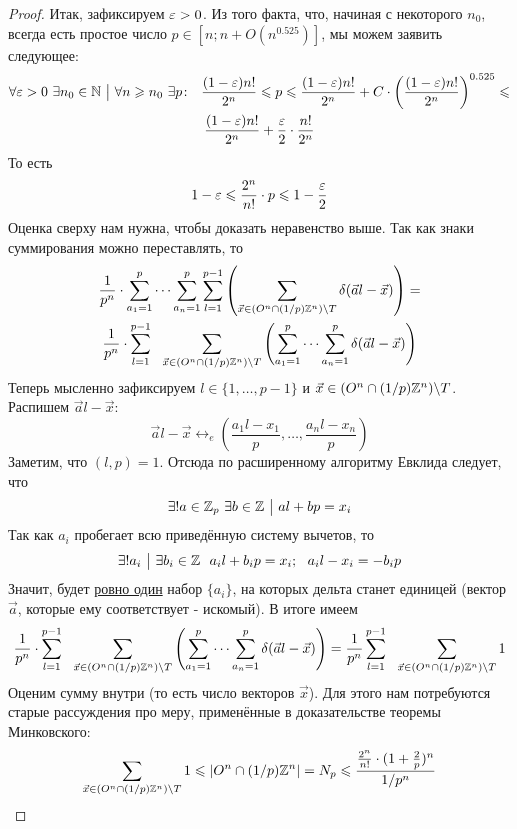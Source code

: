 \begin{proof}
	Итак, зафиксируем $\varepsilon > 0$. Из того факта, что, начиная с некоторого $n_0$, всегда есть простое число $p \in [n; n + O(n^{0.525})]$, мы можем заявить следующее:
	\begin{multline*}
		\forall \eps > 0\ \exists n_0 \in \N \such \forall n \ge n_0\ \exists p \colon\ \ \frac{(1 - \eps)n!}{2^n} \le p \le \frac{(1 - \eps)n!}{2^n} + C \cdot \left(\frac{(1 - \eps) n!}{2^n}\right)^{0.525} \le
		\\
		\frac{(1 - \eps)n!}{2^n} + \frac{\eps}{2} \cdot \frac{n!}{2^n}
	\end{multline*}
	То есть
	\[
		1 - \varepsilon \leqslant \frac{2^n}{n!} \cdot p \leqslant 1 - \frac{\varepsilon}{2}
	\]
	Оценка сверху нам нужна, чтобы доказать неравенство выше. Так как знаки суммирования можно переставлять, то
	\begin{multline*}
		\frac{1}{p^n} \cdot \sum\limits_{a_1 = 1}^p \cdots \sum\limits_{a_n = 1}^p \sum\limits_{l = 1}^{p - 1} \left(\sum\limits_{\vec{x} \in (O^n \cap (1/p)\mathbb{Z}^n) \backslash T} \delta(\vec{a} l - \vec{x})\right) =
		\\
		\frac{1}{p^n} \cdot \sum\limits_{l = 1}^{p - 1}\ \ \sum\limits_{\vec{x} \in (O^n \cap (1 / p)\mathbb{Z}^n) \backslash T} \left(\sum\limits_{a_1 = 1}^p \cdots \sum\limits_{a_n = 1}^p \delta(\vec{a}l - \vec{x})\right)
	\end{multline*}
	Теперь мысленно зафиксируем $l \in \{1, \ldots, p - 1\}$ и $\vec{x} \in (O^n \cap (1 / p)\mathbb{Z}^n) \backslash T$. Распишем $\vec{a}l - \vec{x}$:
	\[
		\vec{a}l - \vec{x} \leftrightarrow_e \left(\frac{a_1 l - x_1}{p}, \ldots, \frac{a_n l - x_n}{p}\right)
	\]
	Заметим, что $(l, p) = 1$. Отсюда по расширенному алгоритму Евклида следует, что
	\[
		\exists! a \in \mathbb{Z}_p\ \exists b \in \mathbb{Z} \ \big|\  al + bp = x_i
	\]
	Так как $a_i$ пробегает всю приведённую систему вычетов, то
	\[
		\exists! a_i \ \big|\  \exists b_i \in \mathbb{Z}\ \ a_i l + b_i p = x_i;\ \ a_i l - x_i = -b_i p
	\]
	Значит, будет \underline{ровно один} набор $\{a_i\}$, на которых дельта станет единицей (вектор $\vec{a}$, которые ему соответствует - искомый). В итоге имеем
	\[
		\frac{1}{p^n} \cdot \suml_{l = 1}^{p - 1}\ \ \suml_{\vec{x} \in (O^n \cap (1 / p)\Z^n) \bs T} \left(\suml_{a_1 = 1}^p \cdots \suml_{a_n = 1}^p \delta(\vec{a}l - \vec{x})\right) = \frac{1}{p^n} \suml_{l = 1}^{p - 1}\ \ \suml_{\vec{x} \in (O^n \cap (1 / p)\Z^n) \bs T} 1
	\]
	Оценим сумму внутри (то есть число векторов $\vec{x}$). Для этого нам потребуются старые рассуждения про меру, применённые в доказательстве теоремы Минковского:
	\[
		\sum\limits_{\vec{x} \in (O^n \cap (1 / p)\mathbb{Z}^n) \backslash T} 1 \leqslant |O^n \cap (1 / p)\mathbb{Z}^n| = N_p \leqslant \frac{\frac{2^n}{n!} \cdot (1 + \frac{2}{p})^n}{1/p^n}
\]
\end{proof}
